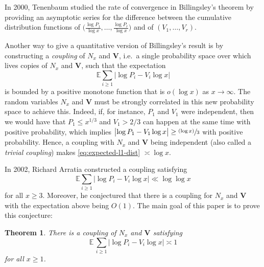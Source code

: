 \documentclass[10pt,a4paper]{amsart}
\providecommand{\ie}{i.e.\ }
\newcommand{\bV}{{\boldsymbol V}}
\newcommand{\psfrac}[2]{\sfrac{(#1)}{#2}}
\newcommand{\EE}{\mathbb{E}}
\newcommand{\bg}{\big}
\theoremstyle{plain}
\newtheorem{theo}{Theorem}
\theoremstyle{definition}
\providecommand{\ie}{i.e. }
\begin{document}
In 2000, Tenenbaum \cite{Tenenbaum00} studied the rate of convergence in Billingsley's theorem by providing an asymptotic series for the difference between the cumulative distribution functions of $\bg(\tfrac{\log P_1}{\log x}, \ldots, \tfrac{\log P_r}{\log x}\bg)$ and of $(V_1, \ldots, V_r)$.

Another way to give a quantitative version of Billingsley's result is by constructing a \emph{coupling} of $N_x$ and $\bV$, \ie a single probability space over which lives copies of $N_x$ and $\bV$, such that the expectation
\begin{equation}
\label{eq:expected-l1-dist}
\EE\sum_{i \ge 1} \bg|{\log P_i - V_i\log x}\bg|
\end{equation}
is bounded by a positive monotone function that is $o(\log x)$ as $x \to \infty$. The random variables $N_x$ and $\bV$ must be strongly correlated in this new probability space to achieve this. Indeed, if, for instance, $P_1$ and $V_1$ were independent, then we would have that $P_1\le x^{1/3}$ and $V_1>2/3$ can happen at the same time with positive probability, which implies $\bg|{\log P_1 - V_1\log x}\bg| \ge \psfrac{\log x}{3}$ with positive probability. Hence, a coupling with $N_x$ and $\bV$ being independent (also called a \emph{trivial coupling}) makes \eqref{eq:expected-l1-dist} $\asymp \log x$.

In 2002, Richard Arratia \cite{Arratia02} constructed a coupling satisfying
\begin{equation}
\label{eq:arratia02-result}
\EE\sum_{i \ge 1} \bg|{\log P_i - V_i\log x}\bg| \ll \log\!\log x
\end{equation}
for all $x \ge 3$. Moreover, he conjectured that there is a coupling for $N_x$ and $\bV$ with the expectation above being $O(1)$. The main goal of this paper is to prove this conjecture:

\begin{theo}
\label{thm:coupling-ub}
There is a coupling of $N_x$ and $\bV$ satisfying
\[
\EE\, \sum_{i \ge 1} \bg|{\log P_i - V_i\log x}\bg| \asymp 1
\]
for all $x \ge 1$.
\end{theo}
\end{document}
